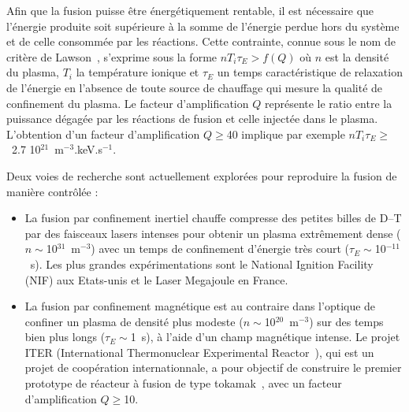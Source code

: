 \begin{refsection}
Afin que la fusion puisse être énergétiquement rentable, il est nécessaire
que l’énergie produite soit supérieure à la somme de l’énergie perdue hors du
système et de celle consommée par les réactions. Cette contrainte, connue sous
le nom de critère de Lawson~\parencite{Lawson}, s'exprime sous la forme
$nT_i\tau_E>f(Q)$ où $n$ est la densité du plasma, $T_i$ la température ionique
et $\tau_E$ un temps caractéristique de relaxation de l'énergie en l'absence de
toute source de chauffage qui mesure la qualité de confinement du plasma. Le
facteur d'amplification $Q$ représente le ratio entre la puissance dégagée par
les réactions de fusion et celle injectée dans le plasma. L'obtention d'un
facteur d'amplification $Q\geq$40 implique par exemple $nT_i\tau_E\geq$~2.7
10$^{21}$~m$^{-3}$.keV.s$^{-1}$.

Deux voies de recherche sont actuellement explorées
pour reproduire la fusion de manière contrôlée :

\begin{itemize}
	\item La fusion par confinement inertiel chauffe compresse des petites
	billes de D--T par des faisceaux lasers intenses pour obtenir un plasma
	extrêmement dense ($n\sim$10$^{31}$~m$^{-3}$) avec un temps de confinement
	d'énergie très court ($\tau_E\sim$10$^{-11}$~s). Les plus grandes
	expérimentations sont le National Ignition Facility (NIF) aux Etats-unis et le
	Laser Megajoule en France.
	\item La fusion par confinement magnétique est au contraire dans l'optique de
	confiner un plasma de densité plus modeste ($n\sim$10$^{20}$~m$^{-3}$) sur des
	temps bien plus longs ($\tau_E\sim$1~s), à l'aide d'un champ magnétique
	intense. Le projet ITER (International Thermonuclear
	Experimental Reactor~\parencite{ITER}), qui est un projet de coopération
	internationnale, a pour objectif de construire le premier prototype de
	réacteur à fusion de type tokamak~\parencite{Wesson}, avec un facteur d'amplification
	$Q\geq$10.
\end{itemize}


\end{refsection}
